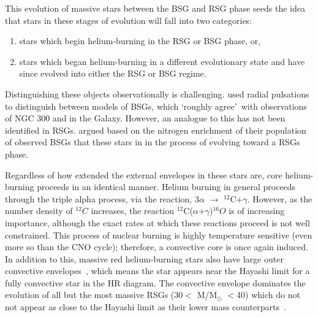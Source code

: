 This evolution of massive stars between the BSG and RSG phase seeds the idea that stars in these stages of evolution will fall into two categories:

\begin{enumerate}
    \item stars which begin helium-burning in the RSG or BSG phase, or,
    \item stars which began helium-burning in a different evolutionary state and have since evolved into either the RSG or BSG regime.
\end{enumerate}

Distinguishing these objects observationally is challenging.
\cite{Saio13} used radial pulsations to distinguish between models of BSGs, which \textquoteleft roughly agree\textquoteright ~with observations of NGC 300 and in the Galaxy.
However, an analogue to this has not been identified in RSGs.
\cite{2012A&A...542A..79C} argued based on the nitrogen enrichment of their population of observed BSGs that these stars in in the process of evolving toward a RSGs phase.

Regardless of how extended the external envelopes in these stars are, core helium-burning proceeds in an identical manner.
Helium burning in general proceeds through the triple alpha process, via the reaction, 3$\alpha$ $\rightarrow$ $^{12}$C+$\gamma$.
However, as the number density of $^{12}C$ increases, the reaction $^{12}$C($\alpha$+$\gamma$)$^{16}O$ is of increasing importance, although the exact rates at which these reactions proceed is not well constrained.
This process of nuclear burning is highly temperature sensitive (even more so than the CNO cycle); therefore, a convective core is once again induced.
In addition to this, massive red helium-burning stars also have large outer convective envelopes~\citep{b:KippenhahnWeigert}, which means the star appears near the Hayashi limit for a fully convective star in the HR diagram.
The convective envelope dominates the evolution of all but the most massive RSGs (30$<$ M/M$_{\odot}$ $<$40) which do not not appear as close to the Hayashi limit as their lower mass counterparts~\citep[see Figure 1 in][]{Saio13}.




